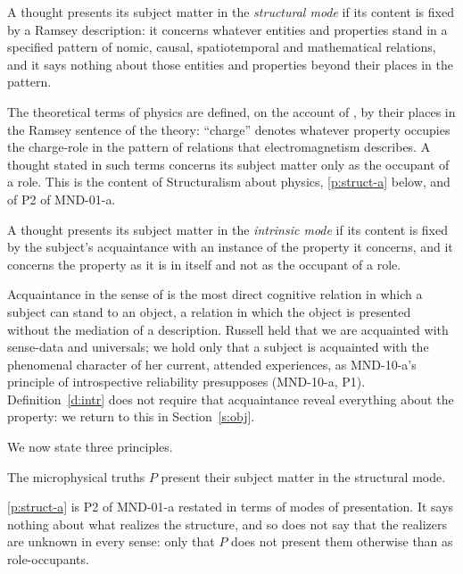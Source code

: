 \documentclass{situationist-preprint}
\begin{document}
\begin{definition}\label{d:struct}
A thought presents its subject matter in the \emph{structural mode} if its content is fixed by a Ramsey description: it concerns whatever entities and properties stand in a specified pattern of nomic, causal, spatiotemporal and mathematical relations, and it says nothing about those entities and properties beyond their places in the pattern.
\end{definition}

The theoretical terms of physics are defined, on the account of \citet{Lewis1970}, by their places in the Ramsey sentence of the theory: \enquote{charge} denotes whatever property occupies the charge-role in the pattern of relations that electromagnetism describes. A thought stated in such terms concerns its subject matter only as the occupant of a role. This is the content of Structuralism about physics, \ref{p:struct-a} below, and of P2 of MND-01-a.

\begin{definition}\label{d:intr}
A thought presents its subject matter in the \emph{intrinsic mode} if its content is fixed by the subject's acquaintance with an instance of the property it concerns, and it concerns the property as it is in itself and not as the occupant of a role.
\end{definition}

Acquaintance in the sense of \citet{Russell1911} is the most direct cognitive relation in which a subject can stand to an object, a relation in which the object is presented without the mediation of a description. Russell held that we are acquainted with sense-data and universals; we hold only that a subject is acquainted with the phenomenal character of her current, attended experiences, as MND-10-a's principle of introspective reliability presupposes (MND-10-a, P1). Definition~\ref{d:intr} does not require that acquaintance reveal everything about the property: we return to this in Section~\ref{s:obj}.

We now state three principles.

\begin{principle}\label{p:struct-a}
The microphysical truths $P$ present their subject matter in the structural mode.
\end{principle}

\ref{p:struct-a} is P2 of MND-01-a restated in terms of modes of presentation. It says nothing about what realizes the structure, and so does not say that the realizers are unknown in every sense: only that $P$ does not present them otherwise than as role-occupants.
\end{document}
